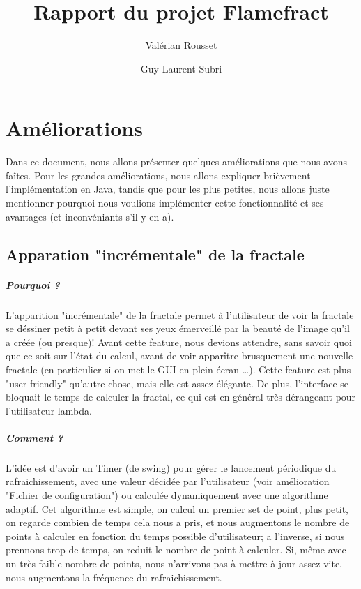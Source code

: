\documentclass[a4paper]{report}
\author{Valérian Rousset \and Guy-Laurent Subri}
\title{Rapport du projet Flamefract}
\begin{document}
\maketitle

\chapter*{Améliorations}
Dans ce document, nous allons présenter quelques améliorations que nous avons faîtes. Pour les grandes améliorations, nous allons expliquer brièvement l'implémentation en Java, tandis que pour les plus petites, nous allons juste mentionner pourquoi nous voulions implémenter cette fonctionnalité et ses avantages (et inconvéniants s'il y en a).

\section*{Apparation "incrémentale" de la fractale}
\paragraph{Pourquoi ?}
L'apparition "incrémentale" de la fractale permet à l'utilisateur de voir la fractale se déssiner petit à petit devant ses yeux émerveillé par la beauté de l'image qu'il a créée (ou presque)! Avant cette feature, nous devions attendre, sans savoir quoi que ce soit sur l'état du calcul, avant de voir apparître brusquement une nouvelle fractale (en particulier si on met le GUI en plein écran \ldots). Cette feature est plus "user-friendly" qu'autre chose, mais elle est assez élégante. De plus, l'interface se bloquait le temps de calculer la fractal, ce qui est en général très dérangeant pour l'utilisateur lambda.

\paragraph{Comment ?}
L'idée est d'avoir un Timer (de swing) pour gérer le lancement périodique du rafraichissement, avec une valeur décidée par l'utilisateur (voir amélioration "Fichier de configuration") ou calculée dynamiquement avec une algorithme adaptif. Cet algorithme est simple, on calcul un premier set de point, plus petit, on regarde combien de temps cela nous a pris, et nous augmentons le nombre de points à calculer en fonction du temps possible d'utilisateur; a l'inverse, si nous prennons trop de temps, on reduit le nombre de point à calculer. Si, même avec un très faible nombre de points, nous n'arrivons pas à mettre à jour assez vite, nous augmentons la fréquence du rafraichissement.
\end{document}
